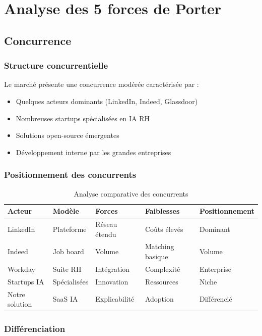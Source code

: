 \documentclass[12pt,a4paper]{report}
\begin{document}
\section{Analyse des 5 forces de Porter}

\subsection{Concurrence}

\subsubsection{Structure concurrentielle}

Le marché présente une concurrence modérée caractérisée par :
\begin{itemize}
\item Quelques acteurs dominants (LinkedIn, Indeed, Glassdoor)
\item Nombreuses startups spécialisées en IA RH
\item Solutions open-source émergentes
\item Développement interne par les grandes entreprises
\end{itemize}

\subsubsection{Positionnement des concurrents}

\begin{table}[H]
\centering
\caption{Analyse comparative des concurrents}
\label{tab:concurrents}
\begin{tabular}{@{}lllll@{}}
\toprule
Acteur & Modèle & Forces & Faiblesses & Positionnement \\
\midrule
LinkedIn & Plateforme & Réseau étendu & Coûts élevés & Dominant \\
Indeed & Job board & Volume & Matching basique & Volume \\
Workday & Suite RH & Intégration & Complexité & Enterprise \\
Startups IA & Spécialisées & Innovation & Ressources & Niche \\
Notre solution & SaaS IA & Explicabilité & Adoption & Différencié \\
\bottomrule
\end{tabular}
\end{table}

\subsubsection{Différenciation}
\end{document}
